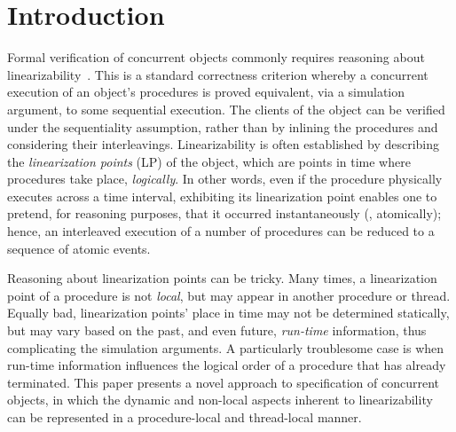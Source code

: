 \section{Introduction}
\label{sc:intro} 
   
Formal verification of concurrent objects commonly requires reasoning
about linearizability~\cite{HerlihyW+TOPLAS90}. This is a standard
correctness criterion whereby a concurrent execution of an object's
procedures is proved equivalent, via a simulation argument, to some
sequential execution. The clients of the object can be verified under
the sequentiality assumption, rather than by inlining the procedures
and considering their interleavings. Linearizability is often
established by describing the \emph{linearization points} (LP) of the
object, which are points in time where procedures take place,
\emph{logically}.  In other words, even if the procedure physically
executes across a time interval, exhibiting its linearization point
enables one to pretend, for reasoning purposes, that it occurred
instantaneously (\ie, atomically); hence, an interleaved execution of
a number of procedures can be reduced to a sequence of atomic events.

Reasoning about linearization points can be tricky. Many times, a
linearization point of a procedure is not \emph{local}, but may appear
in another procedure or thread. Equally bad, linearization points'
place in time may not be determined statically, but may vary based on
the past, and even future, \emph{run-time} information, thus
complicating the simulation arguments. A particularly troublesome case
is when run-time information influences the logical order of a
procedure that has already terminated.
%
This paper presents a novel approach to specification of concurrent
objects, in which the dynamic and non-local aspects inherent to
linearizability can be represented in a procedure-local and
thread-local manner. 



